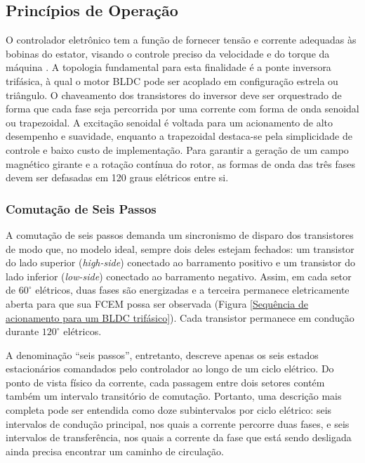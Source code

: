  \subsection{Princípios de Operação} 

 O controlador eletrônico tem a função de fornecer tensão e corrente adequadas às bobinas do estator, visando o controle preciso da velocidade e do torque da máquina \cite{jahns1996pulsating}. A topologia fundamental para esta finalidade é a ponte inversora trifásica, à qual o motor BLDC pode ser acoplado em configuração estrela ou triângulo. O chaveamento dos transistores do inversor deve ser orquestrado de forma que cada fase seja percorrida por uma corrente com forma de onda senoidal ou trapezoidal. A excitação senoidal é voltada para um acionamento de alto desempenho e suavidade, enquanto a trapezoidal destaca-se pela simplicidade de controle e baixo custo de implementação. Para garantir a geração de um campo magnético girante e a rotação contínua do rotor, as formas de onda das três fases devem ser defasadas em 120 graus elétricos entre si.

 \subsubsection{Comutação de Seis Passos} 

 A comutação de seis passos demanda um sincronismo de disparo dos transistores de modo que, no modelo ideal, sempre dois deles estejam fechados: um transistor do lado superior (\textit{high-side}) conectado ao barramento positivo e um transistor do lado inferior (\textit{low-side}) conectado ao barramento negativo. Assim, em cada setor de $60^\circ$ elétricos, duas fases são energizadas e a terceira permanece eletricamente aberta para que sua FCEM possa ser observada (Figura \ref{Sequência de acionamento para um BLDC trifásico}). Cada transistor permanece em condução durante $120^\circ$ elétricos.

 A denominação ``seis passos'', entretanto, descreve apenas os seis estados estacionários comandados pelo controlador ao longo de um ciclo elétrico. Do ponto de vista físico da corrente, cada passagem entre dois setores contém também um intervalo transitório de comutação. Portanto, uma descrição mais completa pode ser entendida como doze subintervalos por ciclo elétrico: seis intervalos de condução principal, nos quais a corrente percorre duas fases, e seis intervalos de transferência, nos quais a corrente da fase que está sendo desligada ainda precisa encontrar um caminho de circulação.

